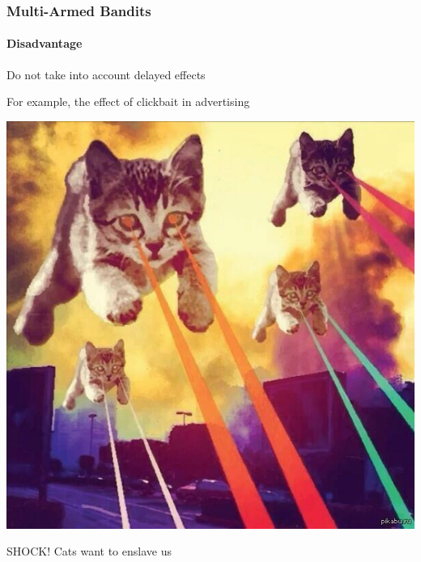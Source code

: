 \documentclass[fullscreen=true, bookmarks=true, hyperref={pdfencoding=unicode}]{beamer}
\begin{document}
\begin{frame}
  \frametitle{Multi-Armed Bandits}
    \framesubtitle{Disadvantage}

   Do not take into account delayed effects

   For example, the effect of clickbait in advertising

   \pause
   \begin{center}
     \includegraphics[keepaspectratio,
                      width=.45\paperwidth]{cats_invaders.jpg}

     SHOCK! Cats want to enslave us
   \end{center}
\end{frame}
\end{document}
